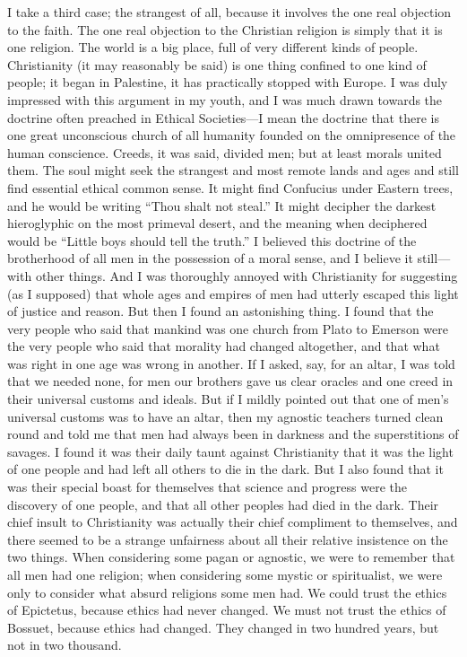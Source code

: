 \documentclass{book}
\begin{document}
I take a third case; the strangest of all, because it involves the one real objection to the faith. The one real objection to the Christian religion is simply that it is one religion. The world is a big place, full of very different kinds of people. Christianity (it may reasonably be said) is one thing confined to one kind of people; it began in Palestine, it has practically stopped with Europe. I was duly impressed with this argument in my youth, and I was much drawn towards the doctrine often preached in Ethical Societies—I mean the doctrine that there is one great unconscious church of all humanity founded on the omnipresence of the human conscience. Creeds, it was said, divided men; but at least morals united them. The soul might seek the strangest and most remote lands and ages and still find essential ethical common sense. It might find Confucius under Eastern trees, and he would be writing “Thou shalt not steal.” It might decipher the darkest hieroglyphic on the most primeval desert, and the meaning when deciphered would be “Little boys should tell the truth.” I believed this doctrine of the brotherhood of all men in the possession of a moral sense, and I believe it still—with other things. And I was thoroughly annoyed with Christianity for suggesting (as I supposed) that whole ages and empires of men had utterly escaped this light of justice and reason. But then I found an astonishing thing. I found that the very people who said that mankind was one church from Plato to Emerson were the very people who said that morality had changed altogether, and that what was right in one age was wrong in another. If I asked, say, for an altar, I was told that we needed none, for men our brothers gave us clear oracles and one creed in their universal customs and ideals. But if I mildly pointed out that one of men’s universal customs was to have an altar, then my agnostic teachers turned clean round and told me that men had always been in darkness and the superstitions of savages. I found it was their daily taunt against Christianity that it was the light of one people and had left all others to die in the dark. But I also found that it was their special boast for themselves that science and progress were the discovery of one people, and that all other peoples had died in the dark. Their chief insult to Christianity was actually their chief compliment to themselves, and there seemed to be a strange unfairness about all their relative insistence on the two things. When considering some pagan or agnostic, we were to remember that all men had one religion; when considering some mystic or spiritualist, we were only to consider what absurd religions some men had. We could trust the ethics of Epictetus, because ethics had never changed. We must not trust the ethics of Bossuet, because ethics had changed. They changed in two hundred years, but not in two thousand.
\end{document}
